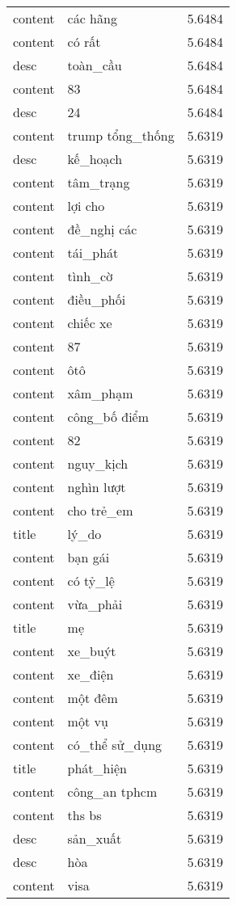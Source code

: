 \documentclass{article}
\begin{document}
\begin{tabular}{lll}
content & các hãng & 5.6484\\
content & có rất & 5.6484\\
desc & toàn\_cầu & 5.6484\\
content & 83 & 5.6484\\
desc & 24 & 5.6484\\
content & trump tổng\_thống & 5.6319\\
desc & kế\_hoạch & 5.6319\\
content & tâm\_trạng & 5.6319\\
content & lợi cho & 5.6319\\
content & đề\_nghị các & 5.6319\\
content & tái\_phát & 5.6319\\
content & tình\_cờ & 5.6319\\
content & điều\_phối & 5.6319\\
content & chiếc xe & 5.6319\\
content & 87 & 5.6319\\
content & ôtô & 5.6319\\
content & xâm\_phạm & 5.6319\\
content & công\_bố điểm & 5.6319\\
content & 82 & 5.6319\\
content & nguy\_kịch & 5.6319\\
content & nghìn lượt & 5.6319\\
content & cho trẻ\_em & 5.6319\\
title & lý\_do & 5.6319\\
content & bạn gái & 5.6319\\
content & có tỷ\_lệ & 5.6319\\
content & vừa\_phải & 5.6319\\
title & mẹ & 5.6319\\
content & xe\_buýt & 5.6319\\
content & xe\_điện & 5.6319\\
content & một đêm & 5.6319\\
content & một vụ & 5.6319\\
content & có\_thể sử\_dụng & 5.6319\\
title & phát\_hiện & 5.6319\\
content & công\_an tphcm & 5.6319\\
content & ths bs & 5.6319\\
desc & sản\_xuất & 5.6319\\
desc & hòa & 5.6319\\
content & visa & 5.6319\\

\end{tabular}
\end{document}
